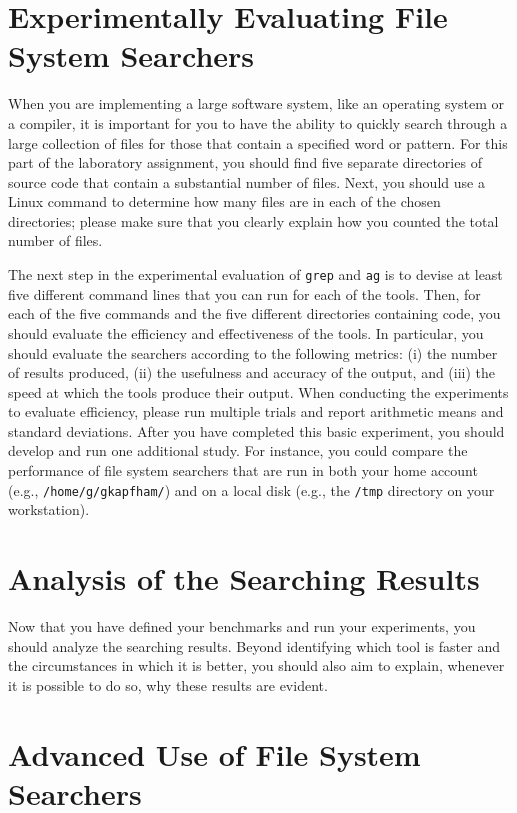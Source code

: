 \section*{Experimentally Evaluating File System Searchers}

When you are implementing a large software system, like an operating system or a compiler, it is important for you to have
the ability to quickly search through a large collection of files for those that contain a specified word or pattern.
For this part of the laboratory assignment, you should find five separate directories of source code that contain a
substantial number of files. Next, you should use a Linux command to determine how many files are in each of the chosen
directories; please make sure that you clearly explain how you counted the total number of files.

The next step in the experimental evaluation of {\tt grep} and {\tt ag} is to devise at least five different command
lines that you can run for each of the tools. Then, for each of the five commands and the five different directories
containing code, you should evaluate the efficiency and effectiveness of the tools. In particular, you should evaluate
the searchers according to the following metrics: (i) the number of results produced, (ii) the usefulness and accuracy
of the output, and (iii) the speed at which the tools produce their output. When conducting the experiments to evaluate
efficiency, please run multiple trials and report arithmetic means and standard deviations. After you have completed
this basic experiment, you should develop and run one additional study. For instance, you could compare the performance
of file system searchers that are run in both your home account (e.g., {\tt /home/g/gkapfham/}) and on a local disk
(e.g., the {\tt /tmp} directory on your workstation).

\section*{Analysis of the Searching Results}

Now that you have defined your benchmarks and run your experiments, you should analyze the searching results. Beyond
identifying which tool is faster and the circumstances in which it is better, you should also aim to explain, whenever
it is possible to do so, why these results are evident.

\section*{Advanced Use of File System Searchers}

